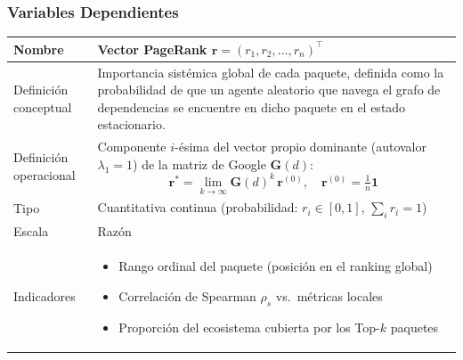 \subsubsection{Variables Dependientes}
\begin{center}
\begin{tabular}{p{3.5cm} p{9cm}}
\toprule
\textbf{Nombre} & \textbf{Vector PageRank} $\mathbf{r} = (r_1, r_2, \ldots, r_n)^\top$ \\
\midrule
Definición conceptual &
    Importancia sistémica global de cada paquete, definida como la probabilidad
    de que un agente aleatorio que navega el grafo de dependencias se encuentre
    en dicho paquete en el estado estacionario. \\[6pt]
Definición operacional &
    Componente $i$-ésima del vector propio dominante (autovalor $\lambda_1 = 1$)
    de la matriz de Google $\mathbf{G}(d)$:
    \[
        \mathbf{r}^* = \lim_{k \to \infty} \mathbf{G}(d)^k \, \mathbf{r}^{(0)},
        \quad \mathbf{r}^{(0)} = \tfrac{1}{n}\mathbf{1}
    \]  \\[6pt]
Tipo & Cuantitativa continua (probabilidad: $r_i \in [0,1]$, $\sum_i r_i = 1$) \\[6pt]
Escala & Razón \\[6pt]
Indicadores &
    \begin{itemize}[nosep]
        \item Rango ordinal del paquete (posición en el ranking global)
        \item Correlación de Spearman $\rho_s$ vs.\ métricas locales
        \item Proporción del ecosistema cubierta por los Top-$k$ paquetes
    \end{itemize} \\
\bottomrule
\end{tabular}
\end{center}

